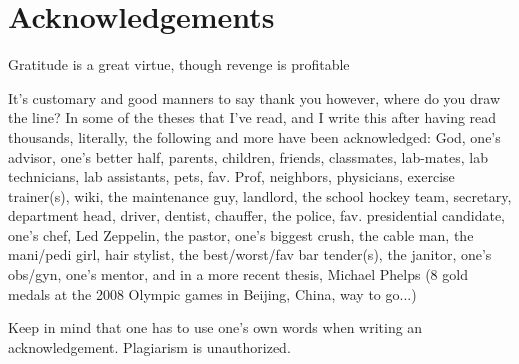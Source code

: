 \section*{Acknowledgements} \label{sectionAcknowledgements}


Gratitude is a great virtue, though revenge is profitable

It's customary and good manners to say thank you however, where do you draw the line? In some of the theses that I've read, and I write this after having read thousands, literally, the following and more have been acknowledged: God, one's advisor, one's better half, parents, children, friends, classmates, lab-mates, lab technicians, lab assistants, pets, fav. Prof, neighbors, physicians, exercise trainer(s), wiki, the maintenance guy, landlord, the school hockey team, secretary, department head, driver, dentist, chauffer, the police, fav. presidential candidate, one's chef, Led Zeppelin, the pastor, one's biggest crush, the cable man, the mani/pedi girl, hair stylist, the best/worst/fav bar tender(s), the janitor, one's obs/gyn, one's mentor, and in a more recent thesis, Michael Phelps (8 gold medals at the 2008 Olympic games in Beijing, China, way to go...)

Keep in mind that one has to use one's own words when writing an acknowledgement. Plagiarism is unauthorized.